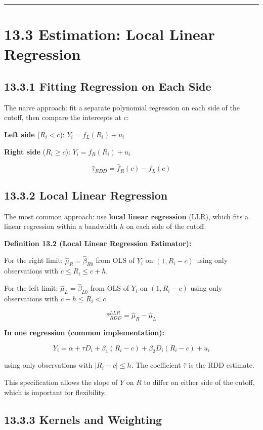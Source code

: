 \medskip\hrule\medskip

\section{13.3 Estimation: Local Linear Regression}

\subsection{13.3.1 Fitting Regression on Each Side}

The naive approach: fit a separate polynomial regression on each side of the cutoff, then compare the intercepts at $c$:

\textbf{Left side} ($R_i < c$): $Y_i = f_L(R_i) + u_i$

\textbf{Right side} ($R_i \geq c$): $Y_i = f_R(R_i) + u_i$

\[
\hat{\tau}_{RDD} = \hat{f}_R(c) - \hat{f}_L(c)
\]

\subsection{13.3.2 Local Linear Regression}

The most common approach: use \textbf{local linear regression} (LLR), which fits a linear regression within a bandwidth $h$ on each side of the cutoff.

\textbf{Definition 13.2 (Local Linear Regression Estimator):} 

For the right limit: $\hat{\mu}_R = \hat{\beta}_{R0}$ from OLS of $Y_i$ on $(1, R_i - c)$ using only observations with $c \leq R_i \leq c + h$.

For the left limit: $\hat{\mu}_L = \hat{\beta}_{L0}$ from OLS of $Y_i$ on $(1, R_i - c)$ using only observations with $c - h \leq R_i < c$.

\[
\hat{\tau}_{RDD}^{LLR} = \hat{\mu}_R - \hat{\mu}_L
\]

\textbf{In one regression (common implementation):}

\[
Y_i = \alpha + \tau D_i + \beta_1 (R_i - c) + \beta_2 D_i(R_i - c) + u_i
\]

using only observations with $|R_i - c| \leq h$. The coefficient $\hat{\tau}$ is the RDD estimate.

This specification allows the slope of $Y$ on $R$ to differ on either side of the cutoff, which is important for flexibility.

\subsection{13.3.3 Kernels and Weighting}

